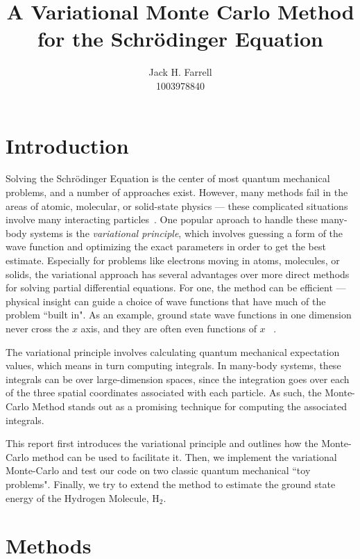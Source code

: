 \documentclass[12pt]{article}
\title{A Variational Monte Carlo Method for the Schr\"odinger Equation}
\author{Jack H. Farrell \\ 1003978840}
\date{}
\numberwithin{equation}{section}
\begin{document}
\maketitle
\tableofcontents
\section{Introduction}
Solving the Schr\"odinger Equation is the center of most quantum mechanical problems, and a number of approaches exist.  However, many methods fail in the areas of atomic, molecular, or solid-state physics --- these complicated situations involve many interacting particles~\cite{sorella_2013}. One popular aproach to handle these many-body systems is the \textit{variational principle}, which involves guessing a form of the wave function and optimizing the exact parameters in order to get the best estimate.  Especially for problems like electrons moving in atoms, molecules, or solids, the variational approach has several advantages over more direct methods for solving partial differential equations.  For one, the method can be efficient --- physical insight can guide a choice of wave functions that have much of the problem ``built in".  As an example, ground state wave functions in one dimension never cross the $x$ axis, and they are often even functions of $x$ ~\cite{shankar_2014}.

The variational principle involves calculating quantum mechanical expectation values, which means in turn computing integrals.  In many-body systems, these integrals can be over large-dimension spaces, since the integration goes over each of the three spatial coordinates associated with each particle.  As such, the Monte-Carlo Method stands out as a promising technique for computing the associated integrals.

This report first introduces the variational principle and outlines how the Monte-Carlo method can be used to facilitate it.  Then, we implement the variational Monte-Carlo and test our code on two classic quantum mechanical ``toy problems".  Finally, we try to extend the method to estimate the ground state energy of the Hydrogen Molecule, $\text{H}_2$.

\section{Methods}
\end{document}
